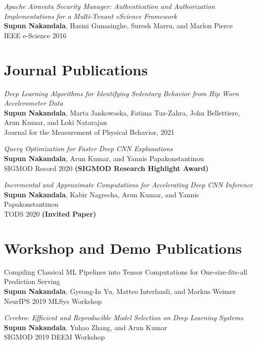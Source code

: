 \documentclass[margin]{res}
\begin{document}
\begin{resume}
\par
\textit{Apache Airavata Security Manager: Authentication and Authorization Implementations for a Multi-Tenant eScience Framework
} \\
\textbf{Supun Nakandala}, Hasini Gunasinghe, Suresh Marru, and Marlon Pierce\\
IEEE e-Science 2016

\section{Journal Publications}
\par
\textit{Deep Learning Algorithms for Identifying Sedentary Behavior from Hip Worn Accelerometer Data} \\
\textbf{Supun Nakandala}, Marta Jankowaska, Fatima Tuz-Zahra, John Bellettiere, Arun Kumar, and Loki Natarajan\\
Journal for the Measurement of Physical Behavior, 2021

\par
\textit{Query Optimization for Faster Deep CNN Explanations} \\
\textbf{Supun Nakandala}, Arun Kumar, and Yannis Papakonstantinou\\
SIGMOD Record 2020 \textbf{(SIGMOD Research Highlight Award)}

\par
\textit{Incremental and Approximate Computations for Accelerating Deep CNN Inference} \\
\textbf{Supun Nakandala}, Kabir Nagrecha, Arun Kumar, and Yannis Papakonstantinou\\
TODS 2020 \textbf{(Invited Paper)}


\section{Workshop and Demo Publications}
\par
Compiling Classical ML Pipelines into Tensor Computations for One-size-fits-all Prediction Serving \\
\textbf{Supun Nakandala}, Gyeong-In Yu, Matteo Interlandi, and Markus Weimer\\
NeurIPS 2019 MLSys Workshop

\par
\textit{Cerebro: Efficient and Reproducible Model Selection on Deep Learning Systems} \\
\textbf{Supun Nakandala}, Yuhao Zhang, and Arun Kumar\\
SIGMOD 2019 DEEM Workshop


\end{resume}
\end{document}
